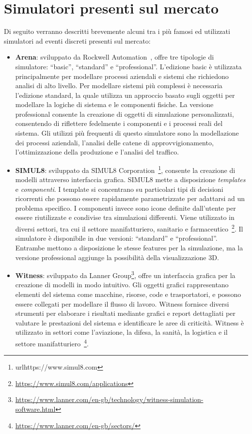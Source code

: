 \documentclass[12pt,a4paper,openright,twoside]{book}
\begin{document}
\section{Simulatori presenti sul mercato}
Di seguito verranno descritti brevemente alcuni tra i più famosi ed utilizzati simulatori ad eventi discreti presenti sul mercato: 
\begin{itemize}
    \item \textbf{Arena}: sviluppato da Rockwell Automation~\cite{1261426}, offre tre tipologie di simulatore: ``basic'', ``standard'' e ``professional''. L'edizione basic è utilizzata principalmente per modellare processi aziendali e sistemi che richiedono analisi di alto livello. Per modellare sistemi più complessi è necessaria l'edizione standard, la quale utilizza un approccio basato sugli oggetti per modellare la logiche di sistema e le componenti fisiche. La versione professional consente la creazione di oggetti di simulazione personalizzati, consentendo di riflettere fedelmente i componenti e i processi reali del sistema. Gli utilizzi più frequenti di questo simulatore sono la modellazione dei processi aziendali, l'analisi delle catene di approvvigionamento, l'ottimizzazione della produzione e l'analisi del traffico. 
    \item \textbf{SIMUL8}: sviluppato da SIMUL8 Corporation~\footnote{url{https://www.simul8.com}}, consente la creazione di modelli attraverso interfaccia grafica. SIMUL8 mette a disposizione \textit{templates} e \textit{componenti}. I template si concentrano su particolari tipi di decisioni ricorrenti che possono essere rapidamente parametrizzate per adattarsi ad un problema specifico. I componenti invece sono icone definite dall'utente per essere riutilizzate e condivise tra simulazioni differenti. Viene utilizzato in diversi settori, tra cui il settore manifatturiero, sanitario e farmaceutico~\footnote{\url{https://www.simul8.com/applications}}. Il simulatore è disponibile in due versioni: ``standard'' e ``professional''. Entrambe mettono a disposizione le stesse features per la simulazione, ma la versione professional aggiunge la possibilità della visualizzazione 3D. 
    \item \textbf{Witness}: sviluppato da Lanner Group\footnote{\url{https://www.lanner.com/en-gb/technology/witness-simulation-software.html}}, offre un interfaccia grafica per la creazione di modelli in modo intuitivo. Gli oggetti grafici rappresentano elementi del sistema come macchine, risorse, code e trasportatori, e possono essere collegati per modellare il flusso di lavoro. Witness fornisce diversi strumenti per elaborare i risultati mediante grafici e report dettagliati per valutare le prestazioni del sistema e identificare le aree di criticità. Witness è utilizzato in settori come l'aviazione, la difesa, la sanità, la logistica e il settore manifatturiero~\footnote{\url{https://www.lanner.com/en-gb/sectors/}}. 
\end{itemize}
\end{document}
